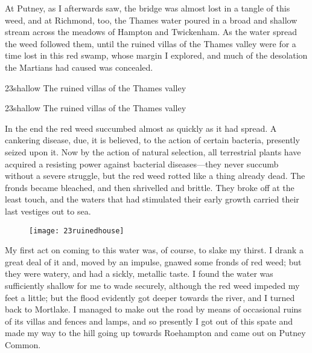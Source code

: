 At Putney, as I afterwards saw, the bridge was almost lost in a tangle of this weed, and at Richmond, too, the Thames water poured in a broad and shallow stream across the meadows of Hampton and Twickenham. As the water spread the weed followed them, until the ruined villas of the Thames valley were for a time lost in this red swamp, whose margin I explored, and much of the desolation the Martians had caused was concealed.


\begin{letter}
	\begin{bwbigpic}
		[1.2] 
		{23shallow} 
		{The ruined villas of the Thames valley} 
	\end{bwbigpic}
\end{letter}
\begin{a4}
	\begin{bwbigpic}
		[1.1] 
		{23shallow} 
		{The ruined villas of the Thames valley} 
	\end{bwbigpic}
\end{a4}

In the end the red weed succumbed almost as quickly as it had spread. A cankering disease, due, it is believed, to the action of certain bacteria, presently seized upon it. Now by the action of natural selection, all terrestrial plants have acquired a resisting power against bacterial diseases—they never succumb without a severe struggle, but the red weed rotted like a thing already dead. The fronds became bleached, and then shrivelled and brittle. They broke off at the least touch, and the waters that had stimulated their early growth carried their last vestiges out to sea.

\begin{figure}[tb]
\centering
\texttt{[image: 23ruinedhouse]}
\end{figure}

My first act on coming to this water was, of course, to slake my thirst. I drank a great deal of it and, moved by an impulse, gnawed some fronds of red weed; but they were watery, and had a sickly, metallic taste. I found the water was sufficiently shallow for me to wade securely, although the red weed impeded my feet a little; but the flood evidently got deeper towards the river, and I turned back to Mortlake. I managed to make out the road by means of occasional ruins of its villas and fences and lamps, and so presently I got out of this spate and made my way to the hill going up towards Roehampton and came out on Putney Common.



